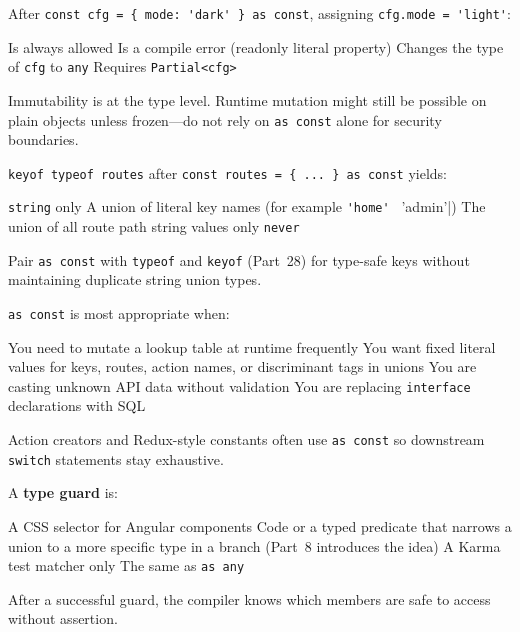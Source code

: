 \question[4]
After \lstinline[style=tsinline]|const cfg = { mode: 'dark' } as const|, assigning \lstinline[style=tsinline]|cfg.mode = 'light'|:
\begin{choices}
  \choice Is always allowed
  \CorrectChoice Is a compile error (readonly literal property)
  \choice Changes the type of \lstinline[style=tsinline]|cfg| to \lstinline[style=tsinline]|any|
  \choice Requires \lstinline[style=tsinline]|Partial<cfg>|
\end{choices}
\begin{solution}
  Immutability is at the type level. Runtime mutation might still be possible on plain objects unless frozen---do not rely on \lstinline[style=tsinline]|as const| alone for security boundaries.
\end{solution}

\question[4]
\lstinline[style=tsinline]|keyof typeof routes| after \lstinline[style=tsinline]|const routes = { ... } as const| yields:
\begin{choices}
  \choice \lstinline[style=tsinline]|string| only
  \CorrectChoice A union of literal key names (for example \lstinline[style=tsinline]|'home' | 'admin'|)
  \choice The union of all route path string values only
  \choice \lstinline[style=tsinline]|never|
\end{choices}
\begin{solution}
  Pair \lstinline[style=tsinline]|as const| with \lstinline[style=tsinline]|typeof| and \lstinline[style=tsinline]|keyof| (Part~28) for type-safe keys without maintaining duplicate string union types.
\end{solution}

\question[4]
\lstinline[style=tsinline]|as const| is most appropriate when:
\begin{choices}
  \choice You need to mutate a lookup table at runtime frequently
  \CorrectChoice You want fixed literal values for keys, routes, action names, or discriminant tags in unions
  \choice You are casting unknown API data without validation
  \choice You are replacing \lstinline[style=tsinline]|interface| declarations with SQL
\end{choices}
\begin{solution}
  Action creators and Redux-style constants often use \lstinline[style=tsinline]|as const| so downstream \lstinline[style=tsinline]|switch| statements stay exhaustive.
\end{solution}

\question[4]
A \textbf{type guard} is:
\begin{choices}
  \choice A CSS selector for Angular components
  \CorrectChoice Code or a typed predicate that narrows a union to a more specific type in a branch (Part~8 introduces the idea)
  \choice A Karma test matcher only
  \choice The same as \lstinline[style=tsinline]|as any|
\end{choices}
\begin{solution}
  After a successful guard, the compiler knows which members are safe to access without assertion.
\end{solution}

